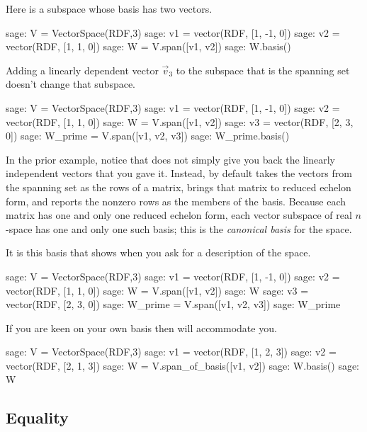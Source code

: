 Here is a subspace whose basis has two vectors.
\begin{sagecommandline}
sage: V = VectorSpace(RDF,3)               
sage: v1 = vector(RDF, [1, -1, 0]) 
sage: v2 = vector(RDF, [1, 1, 0]) 
sage: W = V.span([v1, v2])       
sage: W.basis()
\end{sagecommandline}
Adding a linearly dependent vector $\vec{v}_3$ to the subspace that
is the spanning set doesn't change that subspace.
\begin{sagecommandline}
sage: V = VectorSpace(RDF,3)               
sage: v1 = vector(RDF, [1, -1, 0]) 
sage: v2 = vector(RDF, [1, 1, 0]) 
sage: W = V.span([v1, v2])       
sage: v3 = vector(RDF, [2, 3, 0])
sage: W_prime = V.span([v1, v2, v3])
sage: W_prime.basis()
\end{sagecommandline}

In the prior example, notice that \Sage{} does not simply
give you back the linearly independent
vectors that you gave it.
Instead, by default \Sage{} takes the vectors from the spanning set 
as the rows of a matrix,
brings that matrix to reduced echelon form, and reports the nonzero 
rows as the members of the basis.
Because each matrix has one and only one reduced echelon form, each 
vector subspace of real $n$-space has one and only one such
basis;
this is the \textit{canonical basis} for the space.

It is this basis that \Sage{} shows when you ask for a description
of the space.
\begin{sagecommandline}
sage: V = VectorSpace(RDF,3)               
sage: v1 = vector(RDF, [1, -1, 0]) 
sage: v2 = vector(RDF, [1, 1, 0]) 
sage: W = V.span([v1, v2])       
sage: W
sage: v3 = vector(RDF, [2, 3, 0])
sage: W_prime = V.span([v1, v2, v3])
sage: W_prime
\end{sagecommandline}

If you are keen on your own basis then \Sage{} will
accommodate you.
\begin{sagecommandline}
sage: V = VectorSpace(RDF,3)
sage: v1 = vector(RDF, [1, 2, 3])
sage: v2 = vector(RDF, [2, 1, 3])
sage: W = V.span_of_basis([v1, v2])
sage: W.basis()
sage: W
\end{sagecommandline}




\subsection{Equality}

